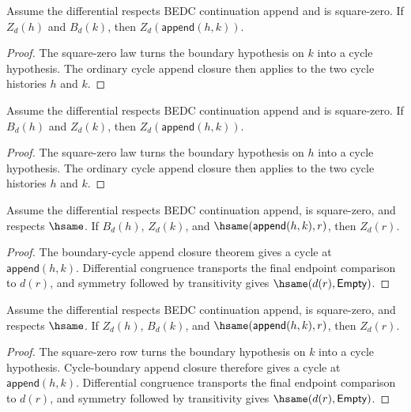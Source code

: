 \begin{theorem}
\label{thm:homology-cycle-boundary-append-cycle-closed}
Assume the differential respects BEDC continuation append and is square-zero.
If $Z_d(h)$ and $B_d(k)$, then $Z_d(\mathsf{append}(h,k))$.
\end{theorem}
\begin{proof}
The square-zero law turns the boundary hypothesis on $k$ into a cycle
hypothesis. The ordinary cycle append closure then applies to the two cycle
histories $h$ and $k$.
\end{proof}

\begin{theorem}
\label{thm:homology-boundary-cycle-append-cycle-closed}
Assume the differential respects BEDC continuation append and is square-zero.
If $B_d(h)$ and $Z_d(k)$, then $Z_d(\mathsf{append}(h,k))$.
\end{theorem}
\begin{proof}
The square-zero law turns the boundary hypothesis on $h$ into a cycle
hypothesis. The ordinary cycle append closure then applies to the two cycle
histories $h$ and $k$.
\end{proof}

\begin{theorem}
\label{thm:homology-boundary-cycle-append-hsame-transport}
Assume the differential respects BEDC continuation append, is square-zero,
and respects $\hsame$. If $B_d(h)$, $Z_d(k)$, and
$\hsame(\mathsf{append}(h,k),r)$, then $Z_d(r)$.
\end{theorem}
\begin{proof}
The boundary-cycle append closure theorem gives a cycle at
$\mathsf{append}(h,k)$. Differential congruence transports the final endpoint
comparison to $d(r)$, and symmetry followed by transitivity gives
$\hsame(d(r),\mathsf{Empty})$.
\end{proof}

\begin{theorem}
\label{thm:homology-cycle-boundary-append-hsame-transport}
Assume the differential respects BEDC continuation append, is square-zero, and
respects $\hsame$. If $Z_d(h)$, $B_d(k)$, and
$\hsame(\mathsf{append}(h,k),r)$, then $Z_d(r)$.
\end{theorem}
\begin{proof}
The square-zero row turns the boundary hypothesis on $k$ into a cycle
hypothesis. Cycle-boundary append closure therefore gives a cycle at
$\mathsf{append}(h,k)$. Differential congruence transports the final endpoint
comparison to $d(r)$, and symmetry followed by transitivity gives
$\hsame(d(r),\mathsf{Empty})$.
\end{proof}

